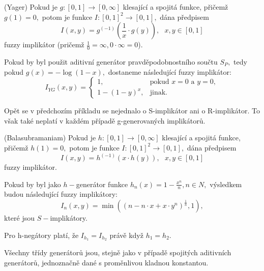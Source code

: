 \begin{sentence}(Yager) 
Pokud je $g: [0,1] \to [0,\infty]$ klesající a spojitá funkce,
přičemž $g(1) = 0,$ potom je funkce $I: [0,1]^2 \to [0,1],$ dána předpisem
$$I(x,y) = g^{(-1)}\left (\frac 1x \cdot g(y)\right ), \mbox {   } x, y \in [0,1]$$
fuzzy implikátor (pričemž $\frac{1}{0} = \infty, 0 \cdot \infty = 0$). \\
\end{sentence}
\begin{example}
    \cite{hlinena}
    Pokud by byl použit aditivní generátor pravděpodobnostního součtu $S_P,$ tedy 
    pokud $g(x) = - \log (1- x),$ dostaneme následující fuzzy implikátor:
    $$I_{YG}(x,y)= \begin{cases} 1,
    &\mbox {pokud $x=0$ a $y=0,$} \\
    1-(1-y)^x, &\mbox {jinak.}
        \end{cases}$$
\end{example}
\begin{remark}
    Opět se v předchozím příkladu se nejednalo o S-implikátor ani o R-implikátor. To však také neplatí v každém případě g-generovaných implikátor\r u.
\end{remark}

\begin{sentence}(Balasubramaniam) 
Pokud je $h: [0,1] \to [0,\infty]$ klesající a spojitá funkce,
přičemž $h(1) = 0,$ potom je funkce $I: [0,1]^2 \to [0,1],$ dána předpisem
$$I(x,y) = h^{(-1)}(x \cdot h(y)), \mbox {   } x, y \in [0,1]$$
fuzzy implikátor. \\
\end{sentence}
\begin{example}
    Pokud by byl jako  $h-$generátor funkce $h_n(x) = 1- \frac {x^n}{n}, n
    \in N,$ výsledkem budou následující fuzzy implikátory:
    $$I_n(x,y) = \min \left ( (n - n \cdot x + x \cdot y^n)^{\frac 1n}, 1\right
    ),$$
    kter\'e jsou $S-$implikátory.
\end{example}
\begin{remark}
    Pro h-negátory platí, že $I_{h_1} = I_{h_2}$ právě když $h_1 = h_2.$
\end{remark}

Všechny třídy generátor\r u jsou, stejně jako v případě spojitých aditivních generátor\r u, jednoznačně dané s proměnlivou kladnou konstantou.

